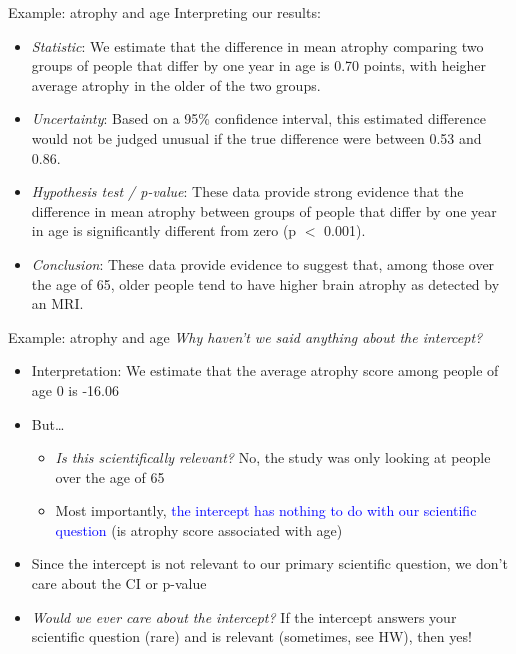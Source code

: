 \documentclass[10pt,t]{beamer}
\begin{document}
\begin{frame}{Example: atrophy and age}
Interpreting our results:
\begin{itemize}
	\item \textit{Statistic}: We estimate that the difference in mean atrophy comparing two groups of people that differ by one year in age is 0.70 points, with heigher average atrophy in the older of the two groups. \pause
	\item \textit{Uncertainty}: Based on a 95\% confidence interval, this estimated difference would not be judged unusual if the true difference were between 0.53 and 0.86. \pause
	\item \textit{Hypothesis test / p-value}: These data provide strong evidence that the difference in mean atrophy between groups of people that differ by one year in age is significantly different from zero (p $<$ 0.001). \pause
	\item \textit{Conclusion}: These data provide evidence to suggest that, among those over the age of 65, older people tend to have higher brain atrophy as detected by an MRI.
\end{itemize}
\end{frame}

\begin{frame}{Example: atrophy and age}
\textit{Why haven't we said anything about the intercept?}
\vspace{0.3cm}
\begin{itemize}
	\item Interpretation: We estimate that the average atrophy score among people of age $0$ is -16.06\pause
	\item But\dots 
	\begin{itemize}
		\item \textit{Is this scientifically relevant?} No, the study was only looking at people over the age of 65
		\item Most importantly, \textcolor{blue}{the intercept has nothing to do with our scientific question} (is atrophy score associated with age)
	\end{itemize} \pause
	\item Since the intercept is not relevant to our primary scientific question, we don't care about the CI or p-value\pause
	\item \textit{Would we ever care about the intercept?} If the intercept answers your scientific question (rare) and is relevant (sometimes, see HW), then yes!
\end{itemize}
\end{frame}
\end{document}
